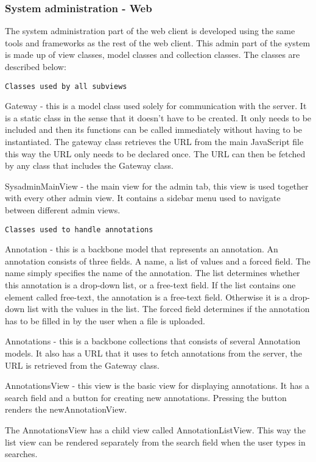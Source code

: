 \subsubsection{System administration - Web}
The system administration part of the web client is developed using the same tools and frameworks as the rest of the web client.
This admin part of the system is made up of view classes, model classes and collection classes. The classes are described below:

\texttt{Classes used by all subviews}

Gateway - this is a model class used solely for communication with the server. It is a static class in the sense that it doesn't have to be created. It only needs to be included and then its functions can be called immediately without having to be instantiated. The gateway class retrieves the URL from the main JavaScript file this way the URL only needs to be declared once. The URL can then be fetched by any class that includes the Gateway class.

SysadminMainView - the main view for the admin tab, this view is used together with every other admin view. It contains a sidebar menu used to navigate between different admin views.

\texttt{Classes used to handle annotations}

Annotation - this is a backbone model that represents an annotation. An annotation consists of three fields. A name, a list of values and a forced field. The name simply specifies the name of the annotation. The list determines whether this annotation is a drop-down list, or a free-text field. If the list contains one element called free-text, the annotation is a free-text field. Otherwise it is a drop-down list with the values in the list. The forced field determines if
the annotation has to be filled in by the user when a file is uploaded.

Annotations - this is a backbone collections that consists of several Annotation models. It also has a URL that it uses to fetch annotations from the server, the URL is retrieved from the Gateway class. 

AnnotationsView - this view is the basic view for displaying annotations. It has a search field and a button for creating new annotations. Pressing the button renders the newAnnotationView. 

The AnnotationsView has a child view called AnnotationListView. This way the list view can be rendered separately from the search field when the user types in searches. 

